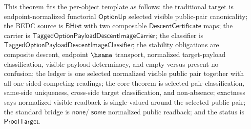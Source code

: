 \begin{theorem}
\label{thm:tagged-option-composite-image-classifier-normalized-selected-visible-public-pair-canonicality}
This theorem fits the per-object template as follows: the traditional target is
endpoint-normalized functorial $\mathsf{OptionUp}$ selected visible public-pair
canonicality; the BEDC source is $\mathsf{BHist}$ with two composable
$\mathsf{DescentCertificate}$ maps; the carrier is
$\mathsf{TaggedOptionPayloadDescentImageCarrier}$; the classifier is
$\mathsf{TaggedOptionPayloadDescentImageClassifier}$; the stability obligations
are composite descent, endpoint $\hsame$ transport, normalized target-payload
classification, visible-payload determinacy, and empty-versus-present
no-confusion; the ledger is one selected normalized visible public pair
together with all one-sided competing readings; the core theorem is selected
pair classification, same-side uniqueness, cross-side target classification,
and non-absence; exactness says normalized visible readback is single-valued
around the selected public pair; the standard bridge is $\mathsf{none}$/
$\mathsf{some}$ normalized public readback; and the status is
$\mathsf{ProofTarget}$.


\end{theorem}
